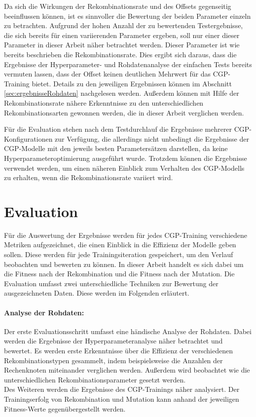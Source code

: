 Da sich die Wirkungen der Rekombinationsrate und des Offsets gegenseitig beeinflussen können, ist es sinnvoller die Bewertung der beiden Parameter einzeln zu betrachten.
Aufgrund der hohen Anzahl der zu bewertenden Testergebnisse, die sich bereits für einen variierenden Parameter ergeben, soll nur einer dieser Parameter in dieser Arbeit näher betrachtet werden.
Dieser Parameter ist wie bereits beschrieben die Rekombinationsrate.
Dies ergibt sich daraus, dass die Ergebnisse der Hyperparameter- und Rohdatenanalyse der einfachen Tests bereits vermuten lassen, dass der Offset keinen deutlichen Mehrwert für das CGP-Training bietet.
Details zu den jeweiligen Ergebnissen können im Abschnitt \ref{sec:ergebnisseRohdaten} nachgelesen werden.
Außerdem können mit Hilfe der Rekombinationsrate nähere Erkenntnisse zu den unterschiedlichen Rekombinationsarten gewonnen werden, die in dieser Arbeit verglichen werden.

Für die Evaluation stehen nach dem Testdurchlauf die Ergebnisse mehrerer CGP-Kon\-fi\-gu\-ra\-tio\-nen zur Verfügung, die allerdings nicht unbedingt die Ergebnisse der CGP-Modelle mit den jeweils besten Parametersätzen darstellen, da keine Hyperparameteroptimierung ausgeführt wurde.
Trotzdem können die Ergebnisse verwendet werden, um einen näheren Einblick zum Verhalten des CGP-Modells zu erhalten, wenn die Rekombinationsrate variiert wird.


\section{Evaluation}
\label{sec:Evaluation}

Für die Auswertung der Ergebnisse werden für jedes CGP-Training verschiedene Metriken aufgezeichnet, die einen Einblick in die Effizienz der Modelle geben sollen.
Diese werden für jede Trainingsiteration gespeichert, um den Verlauf beobachten und bewerten zu können.
In dieser Arbeit handelt es sich dabei um die Fitness nach der Rekombination und die Fitness nach der Mutation.
Die Evaluation umfasst zwei unterschiedliche Techniken zur Bewertung der ausgezeichneten Daten.
Diese werden im Folgenden erläutert.
\paragraph{Analyse der Rohdaten:} Der erste Evaluationsschritt umfasst eine händische Analyse der Rohdaten.
Dabei werden die Ergebnisse der Hyperparameteranalyse näher betrachtet und bewertet.
Es werden erste Erkenntnisse über die Effizienz der verschiedenen Rekombinationstypen gesammelt, indem beispielsweise die Anzahlen der Rechenknoten miteinander verglichen werden.
Außerdem wird beobachtet wie die unterschiedlichen Rekombinationsparameter gesetzt werden.\\
Des Weiteren werden die Ergebnisse des CGP-Trainings näher analysiert.
Der Trainingserfolg von Rekombination und Mutation kann anhand der jeweiligen Fitness-Werte gegenübergestellt werden.
